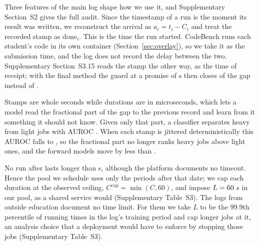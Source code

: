 
Three features of the main log shape how we use it, and Supplementary Section~S2 gives the
full audit. Since the timestamp of a run is the moment its result was written, we
reconstruct the arrival as $a_i = t_i - C_i$ and treat the recorded stamp as
$\mathrm{done}_i$. This is the time the run started. CodeBench runs each student's code in
its own container (Section~\ref{sec:overlay}), so we take it as the submission time, and the
log does not record the delay between the two. Supplementary Section~S3.15 reads the stamp the
other way, as the time of receipt; with the final method the guard at a promise of
 s then closes  of the gap instead of .

Stamps are whole seconds while durations are in microseconds, which lets a model read the
fractional part of the gap to the previous record and learn from it something it should
not know. Given only that part, a classifier separates heavy from light jobs with AUROC
. When each stamp is jittered deterministically this AUROC falls to , so the
fractional part no longer ranks heavy jobs above light ones, and the forward models move by
less than .

No run after  lasts longer than  s, although the platform
documents no timeout. Hence the pool we schedule uses only the periods after that date; we
cap each duration at the
observed ceiling, $C^{\mathrm{cap}} = \min(C, 60)$, and impose $L = 60$ s in our
pool, as a shared service would (Supplementary Table~S3). The logs from outside education
document no time limit. For them we take $L$ to be the 99.9th percentile of running times
in the log's training period and cap longer jobs at it, an analysis choice that a
deployment would have to enforce by stopping those jobs (Supplementary Table~S3).

